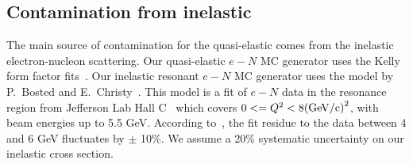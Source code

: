 \subsection{Contamination from inelastic}\label{sec:inel_contam}

The main source of contamination for the quasi-elastic comes from the inelastic electron-nucleon scattering.
Our quasi-elastic $e-N$ MC generator uses the Kelly form factor fits~\cite{}. %
Our inelastic resonant $e-N$ MC generator uses the model by P.~Bosted and E.~Christy~\cite{}. %
This model is a fit of $e-N$ data in the resonance region from Jefferson Lab Hall C~\cite{}
which covers $0<=Q^2<8 {\rm (GeV/c)}^2$, with beam energies up to 5.5 GeV.
According to~\cite{}, %
the fit residue to the data between 4 and 6 GeV fluctuates by $\pm$ 10\%. We assume a 20\% systematic uncertainty on our inelastic cross section. %

